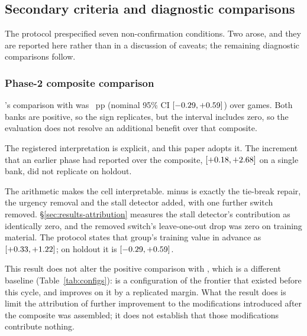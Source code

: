 \subsection{Secondary criteria and diagnostic comparisons}
\label{sec:results-nonconfirm}

The protocol prespecified seven non-confirmation conditions. Two arose, and they are reported here
rather than in a discussion of caveats; the remaining diagnostic comparisons follow.

\subsubsection{Phase-2 composite comparison}
\label{sec:results-composite}

\sestina{}'s comparison with \composite{} was \vsevenBtwoComposite{}~pp (nominal 95\% CI
$[-0.29, +0.59]$) over \vsevenBtwoCompositeN{} games. Both banks
are positive, so the sign replicates, but the interval includes zero, so the evaluation does not
resolve an additional benefit over that composite.

The registered interpretation is explicit, and this paper adopts it. The increment that an earlier
phase had reported over the composite, \vsevenKthreeOverComposite{}
$[+0.18, +2.68]$ on a single bank, did not replicate
on holdout.

The arithmetic makes the cell interpretable. \sestina{} minus \composite{} is exactly the tie-break
repair, the urgency removal and the stall detector added, with one further switch removed.
\S\ref{sec:results-attribution} measures the stall detector's contribution as identically zero, and
the removed switch's leave-one-out drop was zero on training material. The protocol states that
group's training value in advance as \vsevenTrainGroup{} $[+0.33, +1.22]$;
on holdout it is \vsevenBtwoComposite{} $[-0.29, +0.59]$.

This result does not alter the positive comparison with \fcheap{}, which is a different baseline
(Table~\ref{tab:configs}): \fcheap{} is a configuration of the \vsix{} frontier that existed before
this cycle, and \sestina{} improves on it by a replicated margin. What the result does is limit the
attribution of further improvement to the modifications introduced after the composite was
assembled; it does not establish that those modifications contribute nothing.

